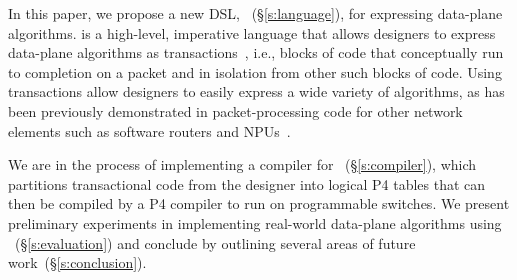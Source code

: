 In this paper, we propose a new DSL, \pktlanguage~(\S\ref{s:language}), for
expressing data-plane algorithms. \pktlanguage is a high-level, imperative
language that allows designers to express data-plane algorithms as
transactions~\cite{transactions}, i.e., blocks of code that conceptually run to
completion on a packet and in isolation from other such blocks of code. Using
transactions allow designers to easily express a wide variety of algorithms, as
has been previously demonstrated in packet-processing code for other network
elements such as software routers and NPUs~\cite{click, intel, qdisc}.

We are in the process of implementing a compiler for
\pktlanguage~(\S\ref{s:compiler}), which partitions transactional code from the
designer into logical P4 tables that can then be compiled by a P4 compiler to
run on programmable switches.  We present preliminary experiments in
implementing real-world data-plane algorithms using
\pktlanguage~(\S\ref{s:evaluation}) and conclude by outlining several areas of
future work~(\S\ref{s:conclusion}).
